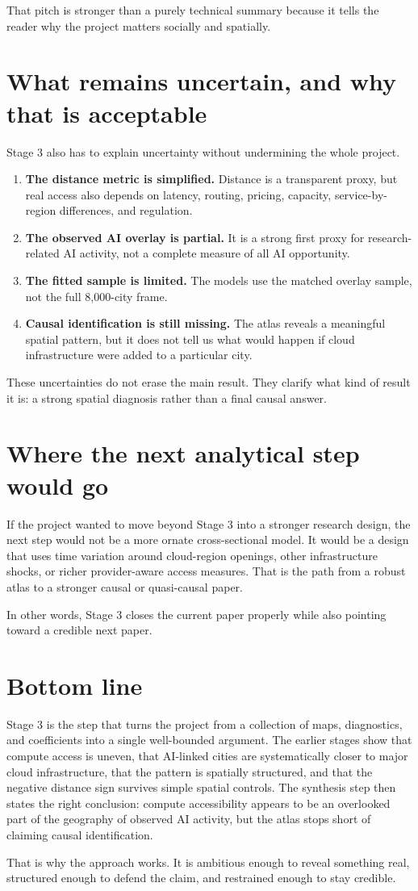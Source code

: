 \documentclass[11pt]{article}
\begin{document}
That pitch is stronger than a purely technical summary because it tells the reader why the project matters socially and spatially.

\section{What remains uncertain, and why that is acceptable}
Stage 3 also has to explain uncertainty without undermining the whole project.
\begin{enumerate}[leftmargin=*]
    \item \textbf{The distance metric is simplified.} Distance is a transparent proxy, but real access also depends on latency, routing, pricing, capacity, service-by-region differences, and regulation.
    \item \textbf{The observed AI overlay is partial.} It is a strong first proxy for research-related AI activity, not a complete measure of all AI opportunity.
    \item \textbf{The fitted sample is limited.} The models use the matched overlay sample, not the full 8{,}000-city frame.
    \item \textbf{Causal identification is still missing.} The atlas reveals a meaningful spatial pattern, but it does not tell us what would happen if cloud infrastructure were added to a particular city.
\end{enumerate}

These uncertainties do not erase the main result. They clarify what kind of result it is: a strong spatial diagnosis rather than a final causal answer.

\section{Where the next analytical step would go}
If the project wanted to move beyond Stage 3 into a stronger research design, the next step would not be a more ornate cross-sectional model. It would be a design that uses time variation around cloud-region openings, other infrastructure shocks, or richer provider-aware access measures. That is the path from a robust atlas to a stronger causal or quasi-causal paper.

In other words, Stage 3 closes the current paper properly while also pointing toward a credible next paper.

\section{Bottom line}
Stage 3 is the step that turns the project from a collection of maps, diagnostics, and coefficients into a single well-bounded argument. The earlier stages show that compute access is uneven, that AI-linked cities are systematically closer to major cloud infrastructure, that the pattern is spatially structured, and that the negative distance sign survives simple spatial controls. The synthesis step then states the right conclusion: compute accessibility appears to be an overlooked part of the geography of observed AI activity, but the atlas stops short of claiming causal identification.

That is why the approach works. It is ambitious enough to reveal something real, structured enough to defend the claim, and restrained enough to stay credible.
\end{document}
